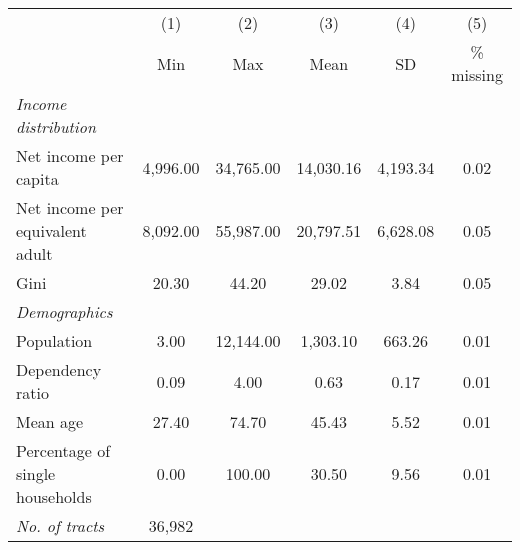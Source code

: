 
\begin{tabular}{@{}lccccc@{}}
\toprule
  & (1) & (2) & (3) &  (4) &  (5) \\
 & Min & Max & Mean & SD & \% missing\\
\midrule
\qquad \textit{Income distribution} \\
Net income per capita &  4,996.00 & 34,765.00 & 14,030.16 &  4,193.34 &      0.02\\
Net income per equivalent adult &  8,092.00 & 55,987.00 & 20,797.51 &  6,628.08 &      0.05\\
Gini &     20.30 &     44.20 &     29.02 &      3.84 &      0.05\\
\qquad \textit{Demographics} \\
Population &      3.00 & 12,144.00 &  1,303.10 &    663.26 &      0.01\\
Dependency ratio &      0.09 &      4.00 &      0.63 &      0.17 &      0.01\\
Mean age &     27.40 &     74.70 &     45.43 &      5.52 &      0.01\\
Percentage of single households &      0.00 &    100.00 &     30.50 &      9.56 &      0.01\\
\textit{No. of tracts} &          36,982 \\
\midrule
\end{tabular}